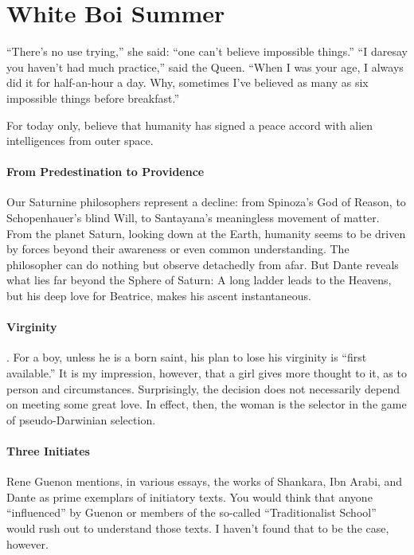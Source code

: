 \section{White Boi Summer}

\begin{quotex}
``There's no use trying,'' she said: ``one can't believe impossible things.'' ``I daresay you haven't had much practice,'' said the Queen. ``When I was your age, I always did it for half-an-hour a day. Why, sometimes I've believed as many as six impossible things before breakfast.''
\end{quotex}


For today only, believe that humanity has signed a peace accord with alien intelligences from outer space.

\paragraph{From Predestination to Providence} Our Saturnine philosophers represent a decline: from Spinoza's God of Reason, to Schopenhauer's blind Will, to Santayana's meaningless movement of matter. From the planet Saturn, looking down at the Earth, humanity seems to be driven by forces beyond their awareness or even common understanding. The philosopher can do nothing but observe detachedly from afar. But Dante reveals what lies far beyond the Sphere of Saturn: A long ladder leads to the Heavens, but his deep love for Beatrice, makes his ascent instantaneous.

\paragraph{Virginity}. For a boy, unless he is a born saint, his plan to lose his virginity is ``first available.'' It is my impression, however, that a girl gives more thought to it, as to person and circumstances. Surprisingly, the decision does not necessarily depend on meeting some great love. In effect, then, the woman is the selector in the game of pseudo-Darwinian selection.

\paragraph{Three Initiates} Rene Guenon mentions, in various essays, the works of Shankara, Ibn Arabi, and Dante as prime exemplars of initiatory texts. You would think that anyone ``influenced'' by Guenon or members of the so-called ``Traditionalist School'' would rush out to understand those texts. I haven't found that to be the case, however.


